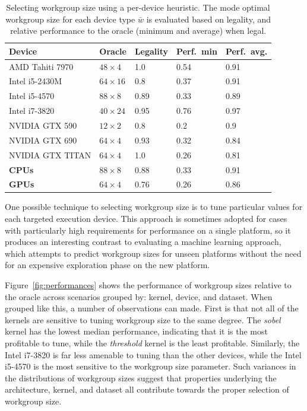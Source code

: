 \documentclass[nonatbib,preprint,10pt]{sigplanconf}
\begin{document}
\begin{table}
  \scriptsize
  \centering
  \begin{tabular}{lllp{1cm}p{1cm}}
    \toprule
    Device &         Oracle & Legality & Perf.\ min & Perf.\ avg. \\
    \midrule
    AMD Tahiti 7970 &   $48\times 4$ &      1.0 &       0.54 &        0.91 \\
    Intel i5-2430M &  $64\times 16$ &      0.8 &       0.37 &        0.91 \\
    Intel i5-4570 &   $88\times 8$ &     0.89 &       0.33 &        0.89 \\
    Intel i7-3820 &  $40\times 24$ &     0.95 &       0.76 &        0.97 \\
    NVIDIA GTX 590 &  $12\times 2$ &      0.8 &        0.2 &         0.9 \\
    NVIDIA GTX 690 &   $64\times 4$ &     0.93 &       0.32 &        0.84 \\
    NVIDIA GTX TITAN &   $64\times 4$ &      1.0 &       0.26 &        0.81 \\
    \textbf{CPUs} &   $88\times 8$ &     0.88 &       0.33 &        0.91 \\
    \textbf{GPUs} &   $64\times 4$ &     0.76 &       0.26 &        0.86 \\
    \bottomrule
  \end{tabular}
  \caption[Performance of tuning with a per-device heuristic]{%
    Selecting workgroup size using a per-device heuristic. The mode
    optimal workgroup size for each device type $\bar{w}$ is evaluated
    based on legality, and relative performance to the oracle (minimum
    and average) when legal.%
  }
  \label{tab:heuristic-dev}
\end{table}

One possible technique to selecting workgroup size is to tune
particular values for each targeted execution device. This approach is
sometimes adopted for cases with particularly high requirements for
performance on a single platform, so it produces an interesting
contrast to evaluating a machine learning approach, which attempts to
predict workgroup sizes for unseen platforms without the need for an
expensive exploration phase on the new platform.

Figure~\ref{fig:performances} shows the performance of workgroup sizes
relative to the oracle across scenarios grouped by: kernel, device,
and dataset. When grouped like this, a number of observations can
made. First is that not all of the kernels are sensitive to tuning
workgroup size to the same degree. The \emph{sobel} kernel has the
lowest median performance, indicating that it is the most profitable
to tune, while the \emph{threshold} kernel is the least
profitable. Similarly, the Intel i7-3820 is far less amenable to
tuning than the other devices, while the Intel i5-4570 is the most
sensitive to the workgroup size parameter. Such variances in the
distributions of workgroup sizes suggest that properties underlying
the architecture, kernel, and dataset all contribute towards the
proper selection of workgroup size.
\end{document}
